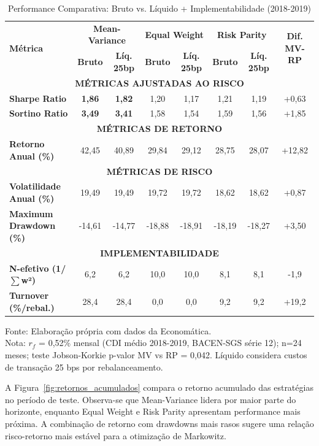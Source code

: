 \begin{table}[H]
\centering
\caption{Performance Comparativa: Bruto vs. Líquido + Implementabilidade (2018-2019)}
\scriptsize
\begin{tabular}{|l|c|c|c|c|c|c|c|}
\hline
\multirow{2}{*}{\textbf{Métrica}} & \multicolumn{2}{c|}{\textbf{Mean-Variance}} & \multicolumn{2}{c|}{\textbf{Equal Weight}} & \multicolumn{2}{c|}{\textbf{Risk Parity}} & \multirow{2}{*}{\textbf{Dif. MV-RP}} \\
\cline{2-7}
 & \textbf{Bruto} & \textbf{Líq. 25bp} & \textbf{Bruto} & \textbf{Líq. 25bp} & \textbf{Bruto} & \textbf{Líq. 25bp} & \\
\hline
\multicolumn{8}{|c|}{\textbf{MÉTRICAS AJUSTADAS AO RISCO}} \\
\hline
\textbf{Sharpe Ratio} & \textbf{1,86} & \textbf{1,82} & 1,20 & 1,17 & 1,21 & 1,19 & +0,63 \\
\textbf{Sortino Ratio} & \textbf{3,49} & \textbf{3,41} & 1,58 & 1,54 & 1,59 & 1,56 & +1,85 \\
\hline
\multicolumn{8}{|c|}{\textbf{MÉTRICAS DE RETORNO}} \\
\hline
\textbf{Retorno Anual (\%)} & 42,45 & 40,89 & 29,84 & 29,12 & 28,75 & 28,07 & +12,82 \\
\hline
\multicolumn{8}{|c|}{\textbf{MÉTRICAS DE RISCO}} \\
\hline
\textbf{Volatilidade Anual (\%)} & 19,49 & 19,49 & 19,72 & 19,72 & 18,62 & 18,62 & +0,87 \\
\textbf{Maximum Drawdown (\%)} & -14,61 & -14,77 & -18,88 & -18,91 & -18,19 & -18,27 & +3,50 \\
\hline
\multicolumn{8}{|c|}{\textbf{IMPLEMENTABILIDADE}} \\
\hline
\textbf{N-efetivo (1/$\sum$w²)} & 6,2 & 6,2 & 10,0 & 10,0 & 8,1 & 8,1 & -1,9 \\
\textbf{Turnover (\%/rebal.)} & 28,4 & 28,4 & 0,0 & 0,0 & 9,2 & 9,2 & +19,2 \\
\hline
\end{tabular}
\label{tab:performance_comparativa_cientifica}
\footnotesize
Fonte: Elaboração própria com dados da Economática.\\
Nota: $r_f$ = 0,52\% mensal (CDI médio 2018-2019, BACEN-SGS série 12); n=24 meses; teste Jobson-Korkie p-valor MV vs RP = 0,042. Líquido considera custos de transação 25 bps por rebalanceamento.
\end{table}

A Figura~\ref{fig:retornos_acumulados} compara o retorno acumulado das estratégias no período de teste. Observa-se que Mean-Variance lidera por maior parte do horizonte, enquanto Equal Weight e Risk Parity apresentam performance mais próxima. A combinação de retorno com drawdowns mais rasos sugere uma relação risco-retorno mais estável para a otimização de Markowitz.


